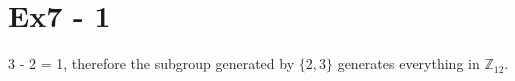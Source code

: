 \section*{Ex7 - 1}
3 - 2 = 1, therefore the subgroup generated by $ \{2, 3\} $ generates everything in $ \mathbb{Z}_{12} $.